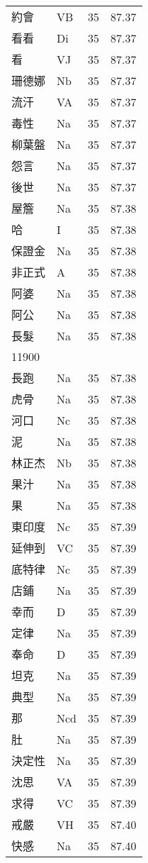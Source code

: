 \documentclass[twocolumn]{book}
\begin{document}
\begin{supertabular}{llrr}
約會 & VB & 35 &  87.37\\
看看 & Di & 35 &  87.37\\
看 & VJ & 35 &  87.37\\
珊德娜 & Nb & 35 &  87.37\\
流汗 & VA & 35 &  87.37\\
毒性 & Na & 35 &  87.37\\
柳葉盤 & Na & 35 &  87.37\\
怨言 & Na & 35 &  87.37\\
後世 & Na & 35 &  87.37\\
屋簷 & Na & 35 &  87.38\\
哈 & I & 35 &  87.38\\
保證金 & Na & 35 &  87.38\\
非正式 & A & 35 &  87.38\\
阿婆 & Na & 35 &  87.38\\
阿公 & Na & 35 &  87.38\\
長髮 & Na & 35 &  87.38\\
11900\\
長跑 & Na & 35 &  87.38\\
虎骨 & Na & 35 &  87.38\\
河口 & Nc & 35 &  87.38\\
泥 & Na & 35 &  87.38\\
林正杰 & Nb & 35 &  87.38\\
果汁 & Na & 35 &  87.38\\
果 & Na & 35 &  87.38\\
東印度 & Nc & 35 &  87.39\\
延伸到 & VC & 35 &  87.39\\
底特律 & Nc & 35 &  87.39\\
店鋪 & Na & 35 &  87.39\\
幸而 & D & 35 &  87.39\\
定律 & Na & 35 &  87.39\\
奉命 & D & 35 &  87.39\\
坦克 & Na & 35 &  87.39\\
典型 & Na & 35 &  87.39\\
那 & Ncd & 35 &  87.39\\
肚 & Na & 35 &  87.39\\
決定性 & Na & 35 &  87.39\\
沈思 & VA & 35 &  87.39\\
求得 & VC & 35 &  87.39\\
戒嚴 & VH & 35 &  87.40\\
快感 & Na & 35 &  87.40\\

\end{supertabular}
\end{document}
